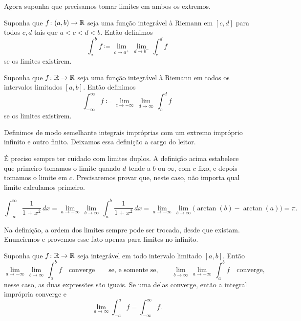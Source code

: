 Agora suponha que precisamos tomar limites em ambos os extremos.

\begin{defn}
Suponha que $f \colon (a,b) \to {\mathbb{R}}$ seja uma função
integrável à Riemann em $[c,d]$ para todos $c,d$
tais que $a < c < d < b$. Então definimos
\begin{equation*}
\int_a^b f \coloneqq \lim_{c \to a^+} \, \lim_{d \to b^-} \, \int_{c}^{d} f
\end{equation*}
se os limites existirem.

Suponha que $f \colon {\mathbb{R}} \to {\mathbb{R}}$ seja uma função integrável à Riemann
em todos os intervalos limitados $[a,b]$. Então definimos
\begin{equation*}
\int_{-\infty}^\infty f \coloneqq \lim_{c \to -\infty} \, \lim_{d \to \infty} \, \int_c^d f
\end{equation*}
se os limites existirem.

Definimos de modo semelhante integrais impróprias com um extremo impróprio
infinito e outro finito. Deixamos essa definição a cargo do leitor.
\end{defn}

É preciso sempre ter cuidado com limites duplos. A definição acima
estabelece que primeiro tomamos o limite quando $d$ tende a $b$ ou
$\infty$, com $c$ fixo, e depois tomamos o limite em $c$.
Precisaremos provar que, neste caso, não importa qual limite
calculamos primeiro.

\begin{example}
\begin{equation*}
\int_{-\infty}^\infty \frac{1}{1+x^2} \, dx
=
\lim_{a \to -\infty} \, \lim_{b \to \infty} \,
\int_{a}^b \frac{1}{1+x^2} \, dx
=
\lim_{a \to -\infty} \, \lim_{b \to \infty}
\bigl( \arctan(b) - \arctan(a) \bigr)
=
\pi .
\end{equation*}
\end{example}

Na definição, a ordem dos limites sempre pode ser trocada, desde que existam.
Enunciemos e provemos esse fato apenas para limites no infinito.

\begin{prop}
Suponha que $f \colon {\mathbb{R}} \to {\mathbb{R}}$ seja integrável em todo intervalo limitado
$[a,b]$.
Então
\begin{equation*}
\lim_{a \to -\infty} \, \lim_{b \to \infty} \, \int_a^b f
\quad \text{converge} \qquad \text{se, e somente se,} \qquad
\lim_{b \to \infty}
\,
\lim_{a \to -\infty}
\,
\int_a^b f
\quad
\text{converge,}
\end{equation*}
nesse caso, as duas expressões são iguais. Se uma delas converge,
então a integral imprópria converge e
\begin{equation*}
\lim_{a\to\infty}
\int_{-a}^a f
=
\int_{-\infty}^\infty f .
\end{equation*}
\end{prop}

